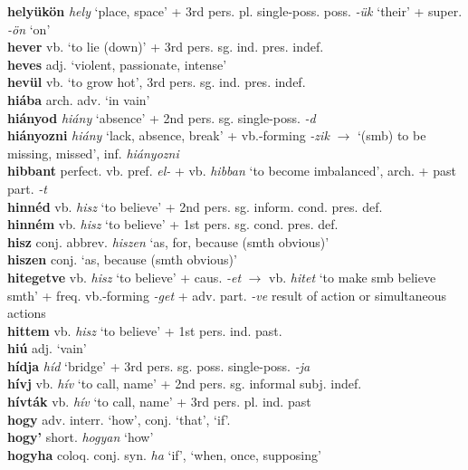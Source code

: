 \documentclass[11pt]{article}
\begin{document}
\textbf{helyükön} \emph{hely} `place, space' + 3rd
pers. pl. single\hyp{}poss. poss. \emph{-ük} `their' +
super. \emph{-ön} `on' \\
\textbf{hever} vb. `to lie (down)' + 3rd
pers. sg. ind. pres. indef. \\
\textbf{heves} adj. `violent, passionate, intense' \\
\textbf{hevül} vb. `to grow hot', 3rd pers. sg. ind. pres. indef. \\
\textbf{hiába} arch. adv. `in vain' \\
\textbf{hiányod} \emph{hiány} `absence' + 2nd pers.
sg. single\hyp{}poss. \emph{-d} \\
\textbf{hiányozni} \emph{hiány} `lack, absence, break' +
vb.-forming \emph{-zik} $\rightarrow$ `(smb) to be missing, missed',
inf. \emph{hiányozni} \\
\textbf{hibbant} perfect. vb. pref. \emph{el-} + vb. \emph{hibban}
  `to become imbalanced', arch. + past part. \emph{-t} \\
\textbf{hinnéd} vb. \emph{hisz} `to believe' + 2nd
pers. sg. inform. cond. pres. def. \\
\textbf{hinném} vb. \emph{hisz} `to believe' + 1st
pers. sg. cond. pres. def. \\
\textbf{hisz} conj. abbrev. \emph{hiszen} `as, for, because (smth obvious)' \\
\textbf{hiszen} conj. `as, because (smth obvious)' \\
\textbf{hitegetve} vb. \emph{hisz} `to believe' + caus. \emph{-et}
$\rightarrow$ vb. \emph{hitet} `to make smb believe smth' +
freq. vb.\hyp{}forming \emph{-get} + adv. part. \emph{-ve} result of action
or simultaneous actions \\
\textbf{hittem} vb. \emph{hisz} `to believe' + 1st pers. ind. past. \\
\textbf{hiú} adj. `vain' \\
\textbf{hídja} \emph{híd} `bridge' + 3rd
pers. sg. poss. single\hyp{}poss. \emph{-ja} \\
\textbf{hívj} vb. \emph{hív} `to call, name' + 2nd pers. sg. informal subj. indef. \\
\textbf{hívták} vb. \emph{hív} `to call, name' + 3rd
pers. pl. ind. past \\
\textbf{hogy} adv. interr. `how', conj. `that', `if'. \\
\textbf{hogy'} short. \emph{hogyan} `how' \\
\textbf{hogyha} coloq. conj. syn. \emph{ha} `if', `when, once, supposing' \\
\end{document}
